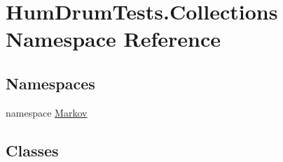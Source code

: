 \hypertarget{namespaceHumDrumTests_1_1Collections}{}\section{Hum\+Drum\+Tests.\+Collections Namespace Reference}
\label{namespaceHumDrumTests_1_1Collections}
\subsection*{Namespaces}
\begin{DoxyCompactItemize}
\item 
namespace \hyperlink{namespaceHumDrumTests_1_1Collections_1_1Markov}{Markov}
\end{DoxyCompactItemize}
\subsection*{Classes}
